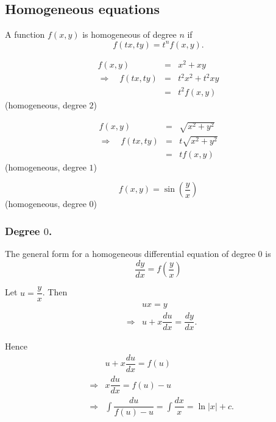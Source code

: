 \subsection{Homogeneous equations}

A function $f(x,y)$ is homogeneous of degree $n$ if
\[
 f(tx,ty) = t^{n} f(x,y).
\]

\begin{examples}
 \quad
 \begin{eqnarray*}
   f(x,y) &=& x^2 + xy\\
  \Rightarrow\quad f(tx, ty) &=& t^2 x^2 + t^2 xy \\
  &=& t^2 f(x,y)
 \end{eqnarray*}
(homogeneous, degree $2$)

 \begin{eqnarray*}
   f(x,y) &=& \sqrt{x^2 + y^2}\\
  \Rightarrow\quad f(tx, ty) &=& t \sqrt{x^2 + y^2} \\
  &=& t f(x,y)
 \end{eqnarray*}
(homogeneous, degree $1$)

\[
 f(x,y) = \sin \left(\dfrac{y}{x}\right)
\]
(homogeneous, degree $0$)
\end{examples}


\subsubsection*{Degree $0$.}

The general form for a homogeneous differential equation of degree $0$ is
\[
 \dfrac{dy}{dx} = f \left(\dfrac{y}{x}\right)
\]

\begin{solution}
 Let $u=\dfrac{y}{x}$. Then
 \begin{eqnarray*}
  && ux = y\\
  &\Rightarrow& u+x \dfrac{du}{dx} = \dfrac{dy}{dx}.
 \end{eqnarray*}

 Hence
  \begin{eqnarray*}
  && u + x \dfrac{du}{dx} = f(u)\\
  &\Rightarrow& x \dfrac{du}{dx} = f(u) - u\\
  &\Rightarrow& \int \dfrac{du}{f(u)-u} = \int \dfrac{dx}{x} = \ln \left|x\right|+c.
 \end{eqnarray*}
\end{solution}

